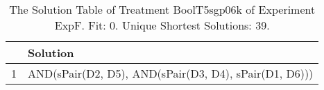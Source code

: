 \begin{table}[ht]
\centering
\begin{tabular}{rp{9cm}}
  \hline
 & Solution \\ 
  \hline
1 & AND(sPair(D2, D5), AND(sPair(D3, D4), sPair(D1, D6))) \\ 
   \hline
\end{tabular}
\caption{The Solution Table of Treatment BoolT5sgp06k of Experiment ExpF. Fit: 0. Unique Shortest Solutions: 39.} 
\end{table}
